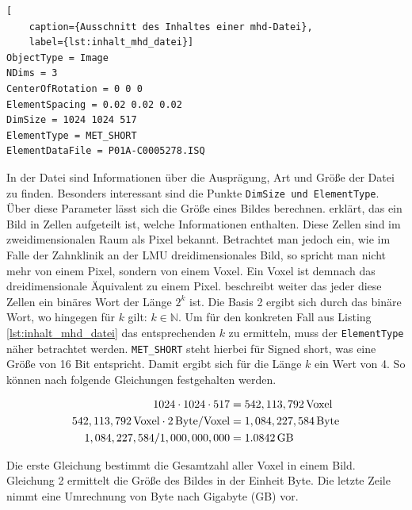 \begin{lstlisting}[
	caption={Ausschnitt des Inhaltes einer mhd-Datei},
	label={lst:inhalt_mhd_datei}]
ObjectType = Image
NDims = 3
CenterOfRotation = 0 0 0
ElementSpacing = 0.02 0.02 0.02
DimSize = 1024 1024 517
ElementType = MET_SHORT
ElementDataFile = P01A-C0005278.ISQ
\end{lstlisting}

In der Datei sind Informationen über die Ausprägung, Art und Größe der Datei zu
finden. Besonders interessant sind die Punkte \texttt{DimSize und ElementType}. Über
diese Parameter lässt sich die Größe eines Bildes berechnen. \citet[Seite 10-11]{burger2009}
erklärt, das ein Bild in Zellen aufgeteilt ist, welche Informationen enthalten. Diese
Zellen sind im zweidimensionalen Raum als Pixel bekannt. Betrachtet man jedoch
ein, wie im Falle der Zahnklinik an der LMU dreidimensionales Bild, so spricht
man nicht mehr von einem Pixel, sondern von einem Voxel. Ein Voxel ist demnach
das dreidimensionale Äquivalent zu einem Pixel. \citet[Seite 10-11]{burger2009} beschreibt
weiter das jeder diese Zellen ein binäres Wort der Länge $2^{k}$ ist. Die Basis
2 ergibt sich durch das binäre Wort, wo hingegen für $k$ gilt:
$k \in \mathbb{N}$. Um für den konkreten Fall aus Listing \ref{lst:inhalt_mhd_datei}
das entsprechenden $k$ zu ermitteln, muss der \texttt{ElementType} näher betrachtet
werden. \texttt{MET\_SHORT} steht hierbei für Signed short, was eine Größe von
16 Bit entspricht. Damit ergibt sich für die Länge $k$ ein Wert von 4. So können
nach \citet[Seite 10-11]{burger2009} folgende Gleichungen festgehalten werden.

\begin{align}
	\label{equ:größe_bestimmen}1024 \cdot 1024 \cdot 517    & = 542,113,792 \, \text{Voxel}\notag  \\
	542,113,792 \, \text{Voxel}\cdot 2 \, \text{Byte/Voxel} & = 1,084,227,584 \, \text{Byte}\notag \\
	1,084,227,584 / 1,000,000,000                           & = 1.0842 \, \text{GB}
\end{align}

Die erste Gleichung bestimmt die Gesamtzahl aller Voxel in einem Bild. Gleichung
2 ermittelt die Größe des Bildes in der Einheit Byte. Die letzte Zeile nimmt
eine Umrechnung von Byte nach Gigabyte (GB) vor.

